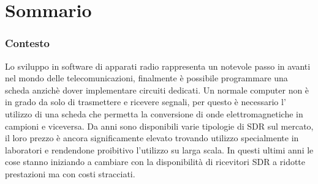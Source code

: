 \chapter*{Sommario} %
\label{sommario}




\subsection{Contesto}
Lo sviluppo in software di apparati radio rappresenta un notevole passo in avanti nel mondo delle telecomunicazioni, finalmente è possibile programmare una scheda anzichè dover implementare circuiti dedicati. Un normale computer non è in grado da solo di trasmettere e ricevere segnali, per questo è necessario l' utilizzo di una scheda che permetta la conversione di onde elettromagnetiche in campioni e viceversa.
Da anni sono disponibili varie tipologie di SDR sul mercato, il loro prezzo è ancora significamente elevato trovando utilizzo specialmente in laboratori e rendendone proibitivo l'utilizzo su larga scala. In questi ultimi anni le cose stanno iniziando a cambiare con la disponibilità di ricevitori SDR a ridotte prestazioni ma con costi stracciati.
